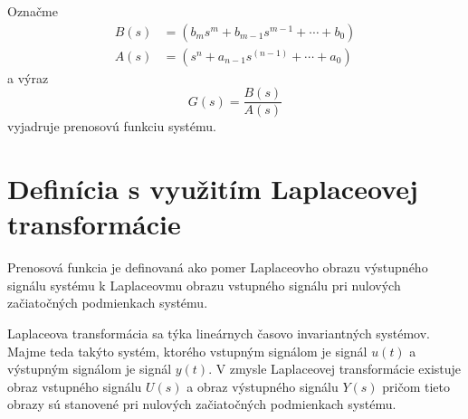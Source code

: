\documentclass[a4paper, 10pt, ]{article}
\begin{document}
Označme
\begin{subequations}
	\begin{align}
		B(s) &= \left( b_m   s^m + b_{m-1}   s^{m-1} + \cdots + b_0 \right) \\
		A(s) &=  \left( s^n + a_{n-1}   s^{(n-1)} + \cdots + a_0 \right)
	\end{align}
\end{subequations}
a výraz
\begin{equation}
	G(s) = \frac{B(s)}{A(s)}
\end{equation}
vyjadruje prenosovú funkciu systému.






\section{Definícia s využitím Laplaceovej transformácie}

Prenosová funkcia je definovaná ako pomer Laplaceovho obrazu výstupného signálu systému k Laplaceovmu obrazu vstupného signálu pri nulových začiatočných podmienkach systému.

Laplaceova transformácia sa týka lineárnych časovo invariantných systémov. Majme teda takýto systém, ktorého vstupným signálom je signál $u(t)$ a výstupným signálom je signál $y(t)$. V zmysle Laplaceovej transformácie existuje obraz vstupného signálu $U(s)$ a obraz výstupného signálu $Y(s)$ pričom tieto obrazy sú stanovené pri nulových začiatočných podmienkach systému.
\end{document}
